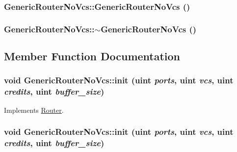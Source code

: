 \hypertarget{classGenericRouterNoVcs_0c9d450ec65aa82e1f82d20b3d7c66e1}{
\subsubsection[{GenericRouterNoVcs}]{\setlength{\rightskip}{0pt plus 5cm}GenericRouterNoVcs::GenericRouterNoVcs ()}}
\label{classGenericRouterNoVcs_0c9d450ec65aa82e1f82d20b3d7c66e1}


\hypertarget{classGenericRouterNoVcs_25aa63b54decdffddb9bfd2da7759c4b}{
\subsubsection[{$\sim$GenericRouterNoVcs}]{\setlength{\rightskip}{0pt plus 5cm}GenericRouterNoVcs::$\sim$GenericRouterNoVcs ()}}
\label{classGenericRouterNoVcs_25aa63b54decdffddb9bfd2da7759c4b}




\subsection{Member Function Documentation}
\hypertarget{classGenericRouterNoVcs_d0abf72a39438d7b23b9b03029d75da2}{
\subsubsection[{init}]{\setlength{\rightskip}{0pt plus 5cm}void GenericRouterNoVcs::init ({\bf uint} {\em ports}, \/  {\bf uint} {\em vcs}, \/  {\bf uint} {\em credits}, \/  {\bf uint} {\em buffer\_\-size})}}
\label{classGenericRouterNoVcs_d0abf72a39438d7b23b9b03029d75da2}




Implements \hyperlink{classRouter_7c551f11fcda9accb02da87c671c4065}{Router}.\hypertarget{classGenericRouterNoVcs_d0abf72a39438d7b23b9b03029d75da2}{
\subsubsection[{init}]{\setlength{\rightskip}{0pt plus 5cm}void GenericRouterNoVcs::init ({\bf uint} {\em ports}, \/  {\bf uint} {\em vcs}, \/  {\bf uint} {\em credits}, \/  {\bf uint} {\em buffer\_\-size})}}
\label{classGenericRouterNoVcs_d0abf72a39438d7b23b9b03029d75da2}




